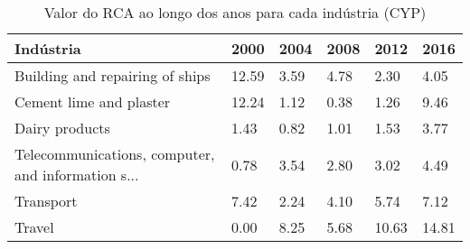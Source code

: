 \begin{table}
\centering
\caption{Valor do RCA ao longo dos anos para cada indústria (CYP)}
\begin{tabular}{p{6cm}p{1.5cm}p{1.5cm}p{1.5cm}p{1.5cm}p{1.5cm}}
\toprule
                                         Indústria &  2000 & 2004 & 2008 &  2012 &  2016 \\
\midrule
                   Building and repairing of ships & 12.59 & 3.59 & 4.78 &  2.30 &  4.05 \\
                           Cement lime and plaster & 12.24 & 1.12 & 0.38 &  1.26 &  9.46 \\
                                    Dairy products &  1.43 & 0.82 & 1.01 &  1.53 &  3.77 \\
Telecommunications, computer, and information s... &  0.78 & 3.54 & 2.80 &  3.02 &  4.49 \\
                                         Transport &  7.42 & 2.24 & 4.10 &  5.74 &  7.12 \\
                                            Travel &  0.00 & 8.25 & 5.68 & 10.63 & 14.81 \\
\bottomrule
\end{tabular}
\end{table}
